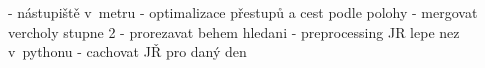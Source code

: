 - nástupiště v~metru - optimalizace přestupů a cest podle polohy
- mergovat vercholy stupne 2
- prorezavat behem hledani
- preprocessing JR lepe nez v~pythonu
- cachovat JŘ pro daný den
